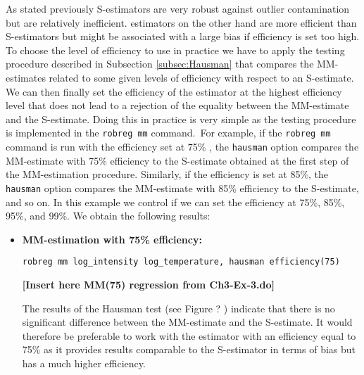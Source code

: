 \begin{stexample}
As stated previously S-estimators are very robust against outlier
contamination but are relatively inefficient.  estimators on the other hand
are more efficient than S-estimators but might be associated with a large bias
if efficiency is set too high. To choose the level of efficiency to use in
practice we have to apply the testing procedure described in Subsection
\ref{subsec:Hausman} that compares the MM-estimates related to some given
levels of efficiency with respect to an S-estimate. We can then finally set
the efficiency of the  estimator at the highest efficiency level that does
not lead to a rejection of the equality between the MM-estimate and the
S-estimate. Doing this in practice is very simple as the testing procedure is
implemented in the
\texttt{robreg mm}%
command.\ For example, if the
\texttt{robreg mm}%
\texttt{ }command is run with the efficiency set at 75\% , the
\texttt{hausman}%
option compares the MM-estimate with 75\% efficiency to the S-estimate
obtained at the first step of the MM-estimation procedure. Similarly, if the
efficiency is set at 85\%, the
\texttt{hausman}%
option compares the MM-estimate with 85\% efficiency to the S-estimate, and so
on. In this example we control if we can set the efficiency at 75\%, 85\%,
95\%, and 99\%. We obtain the following results:

\begin{itemize}
\item \textbf{MM-estimation with 75\% efficiency:}%

\texttt{robreg mm log\_intensity log\_temperature, hausman efficiency(75)}%


\textbf{[Insert here MM(75) regression from Ch3-Ex-3.do]} \ \newline

The results of the Hausman test (see Figure ?%
)
indicate that there is no significant difference between the MM-estimate and
the S-estimate. It would therefore be preferable to work with the  estimator
with an efficiency equal to 75\% as it provides results comparable to the
S-estimator in terms of bias but has a much higher efficiency.


\end{itemize}
\end{stexample}
